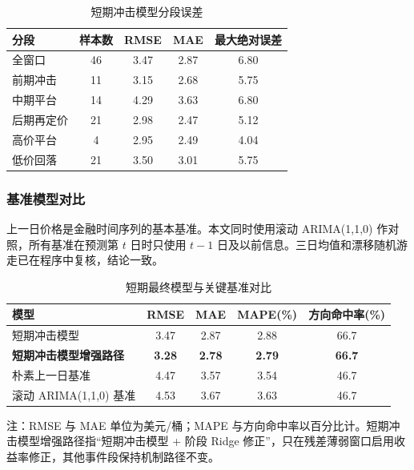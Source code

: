 \begin{table}[!htbp]
\centering
\caption{短期冲击模型分段误差}
\begin{tabular}{l S[table-format=2.0] S[table-format=1.2] S[table-format=1.2] S[table-format=1.2]}
\toprule
分段 & {样本数} & {RMSE} & {MAE} & {最大绝对误差} \\
\midrule
全窗口 & 46 & 3.47 & 2.87 & 6.80 \\
前期冲击 & 11 & 3.15 & 2.68 & 5.75 \\
中期平台 & 14 & 4.29 & 3.63 & 6.80 \\
后期再定价 & 21 & 2.98 & 2.47 & 5.12 \\
高价平台 & 4 & 2.95 & 2.49 & 4.04 \\
低价回落 & 21 & 3.50 & 3.01 & 5.75 \\
\bottomrule
\end{tabular}
\end{table}

\subsubsection{基准模型对比}

上一日价格是金融时间序列的基本基准。本文同时使用滚动 ARIMA(1,1,0) 作对照，所有基准在预测第 \(t\) 日时只使用 \(t-1\) 日及以前信息。三日均值和漂移随机游走已在程序中复核，结论一致。

\begin{table}[!htbp]
\centering
\caption{短期最终模型与关键基准对比}
\begin{threeparttable}
\begin{tabular}{l S[table-format=1.2] S[table-format=1.2] S[table-format=1.2] S[table-format=2.1]}
\toprule
模型 & {RMSE} & {MAE} & {MAPE(\%)} & {方向命中率(\%)} \\
\midrule
短期冲击模型 & 3.47 & 2.87 & 2.88 & 66.7 \\
\textbf{短期冲击模型增强路径} & \textbf{3.28} & \textbf{2.78} & \textbf{2.79} & \textbf{66.7} \\
朴素上一日基准 & 4.47 & 3.57 & 3.54 & 46.7 \\
滚动 ARIMA(1,1,0) 基准 & 4.53 & 3.67 & 3.63 & 46.7 \\
\bottomrule
\end{tabular}
\begin{tablenotes}
\footnotesize
\item 注：RMSE 与 MAE 单位为美元/桶；MAPE 与方向命中率以百分比计。短期冲击模型增强路径指“短期冲击模型 + 阶段 Ridge 修正”，只在残差薄弱窗口启用收益率修正，其他事件段保持机制路径不变。
\end{tablenotes}
\end{threeparttable}
\end{table}

